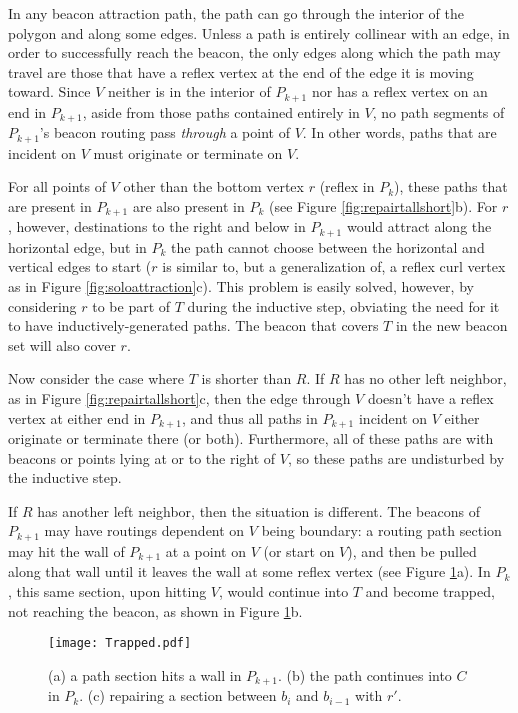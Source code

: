 \documentclass{article}
\begin{document}
	In any beacon attraction path, the path can go through the interior of the
	polygon and along some edges.
	Unless a path is entirely collinear with an edge, in order to successfully
	reach the beacon, the only edges along which the path may travel are those
	that have a reflex vertex at the end of the edge it is moving toward.
	Since $V$ neither is in the
	interior of $P_{k+1}$ nor has a reflex vertex on an end in $P_{k+1}$, 
	aside from those paths contained entirely in $V$, no path segments of
	$P_{k+1}$'s beacon routing pass \emph{through} a point of $V$.
	In other words, paths that are incident on $V$ must originate
	or terminate on $V$.
	
	For all points of $V$ other than the bottom  vertex $r$ (reflex in $P_k$),
	these paths that are present in $P_{k+1}$ are also present in $P_k$ (see Figure
	\ref{fig:repairtallshort}b).  For $r$, however, destinations to the right
	and below in $P_{k+1}$ would attract along the horizontal edge, but in $P_k$
	the path cannot choose between the horizontal and vertical edges to start
	($r$ is similar to, but a generalization of, a reflex curl vertex as in Figure \ref{fig:soloattraction}c).
	This problem is easily solved, however, by considering $r$ to be part of $T$
	during the inductive step, obviating the need for it to have
	inductively-generated paths.  The beacon that covers $T$ in the new beacon set
	will also cover $r$.

	Now consider the case where $T$ is shorter than $R$. 
	If $R$ has no other left neighbor, as in Figure \ref{fig:repairtallshort}c, 
	then the edge through $V$ doesn't have a reflex
	vertex at either end in $P_{k+1}$, and thus all paths in $P_{k+1}$ 
	incident on $V$ either originate or terminate there (or both).
	Furthermore, all of these paths are with beacons or points
	lying at or to the right of $V$, so these paths are undisturbed by the
	inductive step.
	
	If $R$ has another left neighbor, then the situation is different.
	The beacons of $P_{k+1}$ may have routings dependent on $V$ being boundary: a
	routing path section may hit the wall of $P_{k+1}$ at a point on $V$ (or start
	on $V$), and then be pulled along that wall until it leaves the wall at some
	reflex vertex (see Figure \ref{fig:trap}a).  In $P_k$, this same section, upon hitting $V$, would
	continue into $T$ and become trapped, not reaching the beacon, as shown in 
	Figure \ref{fig:trap}b.

	\begin{figure}[htbp] 
		\begin{center}
		    \texttt{[image: Trapped.pdf]} 
		\end{center}
		\caption{
		    (a) a path section hits a wall in $P_{k+1}$.
		    (b) the path continues into $C$ in $P_k$.
		    (c) repairing a section between $b_i$ and $b_{i-1}$ with $r'$.
		}
		\label{fig:trap}
	\end{figure}
\end{document}
